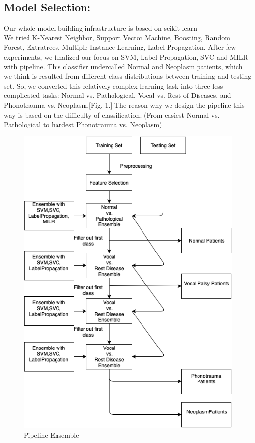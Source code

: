 \documentclass[conference]{IEEEtran}
\begin{document}
\subsection{Model Selection:}
	Our whole model-building infrastructure is based on scikit-learn\cite{b2}\cite{b3}. \\
	We tried K-Nearest Neighbor, Support Vector Machine, Boosting, Random Forest, Extratrees, Multiple Instance Learning, Label Propagation. After few experiments, we finalized our focus on SVM, Label Propagation, SVC and MILR with pipeline. This classifier undercalled Normal and Neoplasm patients, which we think is resulted from different class distributions between training and testing set. So, we converted this relatively complex learning task into three less complicated tasks: Normal vs. Pathological, Vocal vs. Rest of Diseases, and Phonotrauma vs. Neoplasm.[Fig. 1.] The reason why we design the pipeline this way is based on the difficulty of classification. (From easiest Normal vs. Pathological to hardest Phonotrauma vs. Neoplasm)
	\begin{figure}[htbp]
		\begin{center}
			\includegraphics[scale=0.35]{Diagram_1.png}
		\end{center}
		\caption{Pipeline Ensemble}
	\end{figure}
\end{document}
